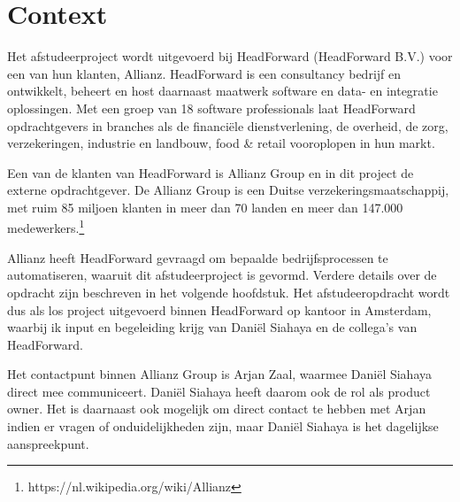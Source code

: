 \chapter{Context}\label{chap:context}
Het afstudeerproject wordt uitgevoerd bij HeadForward (HeadForward B.V.) voor een van hun klanten, Allianz. HeadForward is een consultancy bedrijf en ontwikkelt, beheert en host daarnaast maatwerk software en data- en integratie oplossingen. Met een groep van 18 software professionals laat HeadForward opdrachtgevers in branches als de financiële dienstverlening, de overheid, de zorg, verzekeringen, industrie en landbouw, food \& retail vooroplopen in hun markt.\par

Een van de klanten van HeadForward is Allianz Group en in dit project de externe opdrachtgever. De Allianz Group is een Duitse verzekeringsmaatschappij, met ruim 85 miljoen klanten in meer dan 70 landen en meer dan 147.000 medewerkers.\footnote{https://nl.wikipedia.org/wiki/Allianz} \par

Allianz heeft HeadForward gevraagd om bepaalde bedrijfsprocessen te automatiseren, waaruit dit afstudeerproject is gevormd. Verdere details over de opdracht zijn beschreven in het volgende hoofdstuk. Het afstudeeropdracht wordt dus als los project uitgevoerd binnen HeadForward op kantoor in Amsterdam, waarbij ik input en begeleiding krijg van Dani\"el Siahaya en de collega's van HeadForward.\par

Het contactpunt binnen Allianz Group is Arjan Zaal, waarmee Dani\"el Siahaya direct mee communiceert. Dani\"el Siahaya heeft daarom ook de rol als product owner. Het is daarnaast ook mogelijk om direct contact te hebben met Arjan indien er vragen of onduidelijkheden zijn, maar Dani\"el Siahaya is het dagelijkse aanspreekpunt.\par